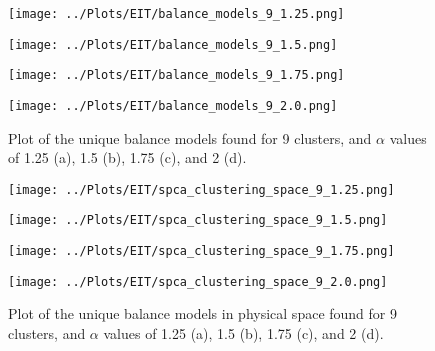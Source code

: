 \documentclass[12pt]{report} %
\begin{document}
\begin{figure}[htbp]
  \centering
  \begin{minipage}{0.5\textwidth}
    \centering
    \texttt{[image: ../Plots/EIT/balance\_models\_9\_1.25.png]}
    \subcaption{}
  \end{minipage}

  \begin{minipage}{0.5\textwidth}
    \centering
    \texttt{[image: ../Plots/EIT/balance\_models\_9\_1.5.png]}
    \subcaption{}
  \end{minipage}

  \begin{minipage}{0.45\textwidth}
    \centering
    \texttt{[image: ../Plots/EIT/balance\_models\_9\_1.75.png]}
    \subcaption{}
  \end{minipage}

  \begin{minipage}{0.45\textwidth}
    \centering
    \texttt{[image: ../Plots/EIT/balance\_models\_9\_2.0.png]}
    \subcaption{}
  \end{minipage}

  \caption{Plot of the unique balance models found for 9 clusters, and $\alpha$ values of 1.25 (a), 1.5 (b), 1.75 (c), and 2 (d).}
  \label{fig:EIT_balance_models}
\end{figure}

\begin{figure}[htbp]
  \centering
  \begin{minipage}{0.6\textwidth}
    \centering
    \texttt{[image: ../Plots/EIT/spca\_clustering\_space\_9\_1.25.png]}
    \subcaption{}
  \end{minipage}

  \begin{minipage}{0.6\textwidth}
    \centering
    \texttt{[image: ../Plots/EIT/spca\_clustering\_space\_9\_1.5.png]}
    \subcaption{}
  \end{minipage}

  \begin{minipage}{0.6\textwidth}
    \centering
    \texttt{[image: ../Plots/EIT/spca\_clustering\_space\_9\_1.75.png]}
    \subcaption{}
  \end{minipage}

  \begin{minipage}{0.6\textwidth}
    \centering
    \texttt{[image: ../Plots/EIT/spca\_clustering\_space\_9\_2.0.png]}
    \subcaption{}
  \end{minipage}

  \caption{Plot of the unique balance models in physical space found for 9 clusters, and $\alpha$ values of 1.25 (a), 1.5 (b), 1.75 (c), and 2 (d).}
  \label{fig:EIT_clustering}
\end{figure}












\end{document}
